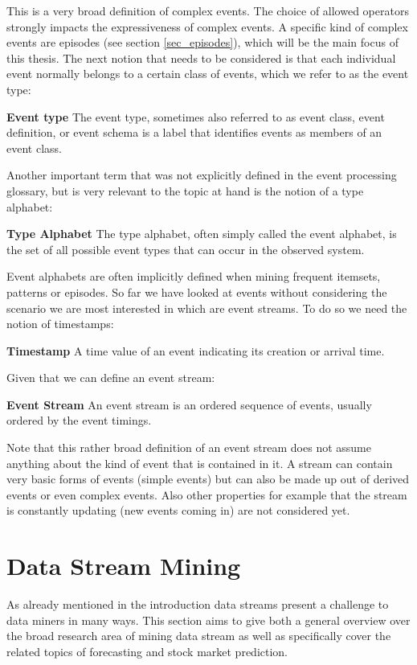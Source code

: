 This is a very broad definition of complex events. The choice of allowed operators strongly impacts the expressiveness of complex events. A specific kind of complex events are episodes (see section \ref{sec_episodes}), which will be the main focus of this thesis.
The next notion that needs to be considered is that each individual event normally belongs to a certain class of events, which we refer to as the event type:

\begin{mydef}
\textbf{Event type} The event type, sometimes also referred to as event class, event definition, or event schema is a label that identifies events as members of an event class.
\end{mydef}

Another important term that was not explicitly defined in the event processing glossary, but is very relevant to the topic at hand is the notion of a type alphabet:

\begin{mydef}
\textbf{Type Alphabet} The type alphabet, often simply called the event alphabet, is the set of all possible event types that can occur in the observed system.
\end{mydef}

Event alphabets are often implicitly defined when mining frequent itemsets, patterns or episodes.
So far we have looked at events without considering the scenario we are most interested in which are event streams. To do so we need the notion of timestamps:

\begin{mydef}
\textbf{Timestamp} A time value of an event indicating its creation or arrival time.
\end{mydef}

Given that we can define an event stream:

\begin{mydef}
\textbf{Event Stream} An event stream is an ordered sequence of events, usually ordered by the event timings.
\end{mydef}

Note that this rather broad definition of an event stream does not assume anything about the kind of event that is contained in it. A stream can contain very basic forms of events (simple events) but can also be made up out of derived events or even complex events. Also other properties for example that the stream is constantly updating (new events coming in) are not considered yet.


\section{Data Stream Mining}
As already mentioned in the introduction data streams present a challenge to data miners in many ways. This section aims to give both a general overview over the broad research area of mining data stream as well as specifically cover the related topics of forecasting and stock market prediction.

